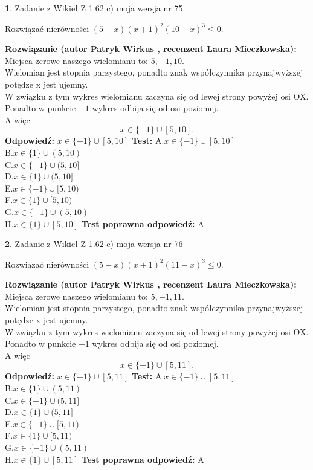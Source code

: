 \documentclass[12pt, a4paper]{article}
\theoremstyle{definition} %
\newtheorem{zad}{}
\newcommand{\zadStart}[1]{\begin{zad}#1\newline}
\newcommand{\zadStop}{\end{zad}}
\newcommand{\rozwStart}[2]{\noindent \textbf{Rozwiązanie (autor #1 , recenzent #2): }\newline}
\newcommand{\rozwStop}{\newline}
\newcommand{\odpStart}{\noindent \textbf{Odpowiedź:}\newline}
\newcommand{\odpStop}{\newline}
\newcommand{\testStart}{\noindent \textbf{Test:}\newline}
\newcommand{\testStop}{\newline}
\newcommand{\kluczStart}{\noindent \textbf{Test poprawna odpowiedź:}\newline}
\newcommand{\kluczStop}{\newline}
\begin{document}
\zadStart{Zadanie z Wikieł Z 1.62 c) moja wersja nr 75}

Rozwiązać nierówności $(5-x)(x+1)^{2}(10-x)^{3}\le0$.
\zadStop
\rozwStart{Patryk Wirkus}{Laura Mieczkowska}
Miejsca zerowe naszego wielomianu to: $5, -1, 10$.\\
Wielomian jest stopnia parzystego, ponadto znak współczynnika przy\linebreak najwyższej potędze x jest ujemny.\\ W związku z tym wykres wielomianu zaczyna się od lewej strony powyżej osi OX.\\
Ponadto w punkcie $-1$ wykres odbija się od osi poziomej.\\
A więc $$x \in \{-1\} \cup [5,10].$$
\rozwStop
\odpStart
$x \in \{-1\} \cup [5,10]$
\odpStop
\testStart
A.$x \in \{-1\} \cup [5,10]$\\
B.$x \in \{1\} \cup (5,10)$\\
C.$x \in \{-1\} \cup (5,10]$\\
D.$x \in \{1\} \cup (5,10]$\\
E.$x \in \{-1\} \cup [5,10)$\\
F.$x \in \{1\} \cup [5,10)$\\
G.$x \in \{-1\} \cup (5,10)$\\
H.$x \in \{1\} \cup [5,10]$
\testStop
\kluczStart
A
\kluczStop



\zadStart{Zadanie z Wikieł Z 1.62 c) moja wersja nr 76}

Rozwiązać nierówności $(5-x)(x+1)^{2}(11-x)^{3}\le0$.
\zadStop
\rozwStart{Patryk Wirkus}{Laura Mieczkowska}
Miejsca zerowe naszego wielomianu to: $5, -1, 11$.\\
Wielomian jest stopnia parzystego, ponadto znak współczynnika przy\linebreak najwyższej potędze x jest ujemny.\\ W związku z tym wykres wielomianu zaczyna się od lewej strony powyżej osi OX.\\
Ponadto w punkcie $-1$ wykres odbija się od osi poziomej.\\
A więc $$x \in \{-1\} \cup [5,11].$$
\rozwStop
\odpStart
$x \in \{-1\} \cup [5,11]$
\odpStop
\testStart
A.$x \in \{-1\} \cup [5,11]$\\
B.$x \in \{1\} \cup (5,11)$\\
C.$x \in \{-1\} \cup (5,11]$\\
D.$x \in \{1\} \cup (5,11]$\\
E.$x \in \{-1\} \cup [5,11)$\\
F.$x \in \{1\} \cup [5,11)$\\
G.$x \in \{-1\} \cup (5,11)$\\
H.$x \in \{1\} \cup [5,11]$
\testStop
\kluczStart
A
\kluczStop
\end{document}
